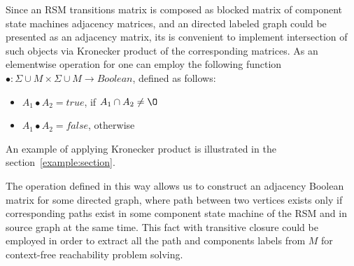 Since an RSM transitions matrix is composed as blocked matrix of component state machines adjacency matrices, and an directed labeled graph could be presented as an adjacency matrix, its is convenient to implement intersection of such objects via Kronecker product of the corresponding matrices. As an elementwise operation for one can employ the following function $\bullet: \Sigma \cup M \times \Sigma \cup M \to Boolean$, defined as follows: 

\begin{itemize}
    \item $A_1 \bullet A_2 = true$, if $A_1 \cap A_2 \neq \O$
    \item $A_1 \bullet A_2 = false$, otherwise
\end{itemize}

An example of applying Kronecker product is illustrated in the section~\ref{example:section}. 

The operation defined in this way allows us to construct an adjacency Boolean matrix for some directed graph, where path between two vertices exists only if corresponding paths exist in some component state machine of the RSM and in source graph at the same time. 
This fact with transitive closure could be employed in order to extract all the path and components labels from $M$ for context-free reachability problem solving.
